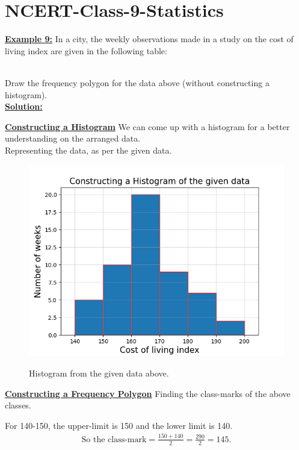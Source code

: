 \documentclass[journal,12pt,twocolumn]{IEEEtran}
\begin{document}
	\section{NCERT-Class-9-Statistics}
\textbf{\underline{Example 9:}} In a city, the weekly observations made in a study on the cost of living index are given in the following table:
\begin{table}[!htb]

\end{table}\\
Draw the frequency polygon for the data above (without constructing a histogram).\\
	\textbf{\underline{Solution:} }
	\itemize
	\item\textbf{\underline{Constructing a Histogram}} We can come up with a histogram for a better understanding on the arranged data.\\ Representing the data, as per the given data.
	\begin{figure}[!ht]
		\centering
		\includegraphics[width=\columnwidth]{Fig_1}
		\label{fig:1}
		\caption{Histogram from the given data above.}
	\end{figure}
	\item\textbf{\underline{Constructing a Frequency Polygon}} Finding the class-marks of the above classes.\\
	\itemize
	\item For 140-150, the upper-limit is 150 and the lower limit is 140.
	\begin{align*}
	\text{So the class-mark}=\frac{150+140}{2}=\frac{290}{2}=145.
	\end{align*}
\end{document}
